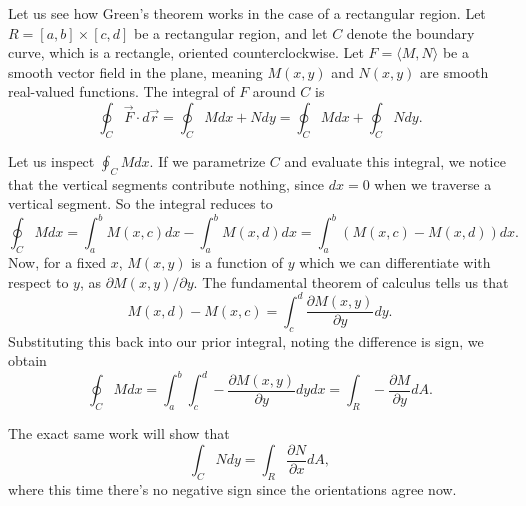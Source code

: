 \documentclass{article}
\begin{document}


Let us see how Green's theorem works in the case of a rectangular region.
Let $R=[a,b]\times[c,d]$ be a rectangular region, and let $C$ denote the boundary
curve, which is a rectangle, oriented counterclockwise. 
Let $F = \langle M,N \rangle$ be a smooth vector field in the plane, meaning
$M(x,y)$ and $N(x,y)$ are smooth real-valued functions. The integral of $F$ around $C$ is
\[ \oint_C \vec{F} \cdot d\vec{r} = \oint_C Mdx + Ndy = \oint_C Mdx + \oint_C Ndy. \]

Let us inspect $\oint_C M dx$. If we parametrize $C$ and evaluate this integral, 
we notice that the vertical segments contribute nothing, since $dx=0$ when we traverse a vertical segment.
So the integral reduces to
\[\oint_C M dx = \int_a^b M(x,c) dx - \int_a^b M(x,d)dx=\int_a^b \left( M(x,c)-M(x,d)\right)dx.\]
Now, for a fixed $x$, $M(x,y)$ is a function of $y$ which we can 
differentiate with respect to $y$, as $\partial M(x,y) / \partial y$. The fundamental theorem
of calculus tells us that
\[M(x,d) - M(x,c) = \int_c^d \frac{\partial M(x,y)}{\partial y}dy. \]
Substituting this back into our prior integral, noting the difference is sign, we obtain
\[\oint_C M dx = \int_a^b \int_c^d -\frac{\partial M(x,y)}{\partial y}dydx=\int_R -\frac{\partial M}{\partial y}dA.\]

The exact same work will show that 
\[\int_C N dy = \int_R \frac{\partial N}{\partial x} dA,\]
where this time there's no negative sign since the orientations agree now. 

\end{document}
